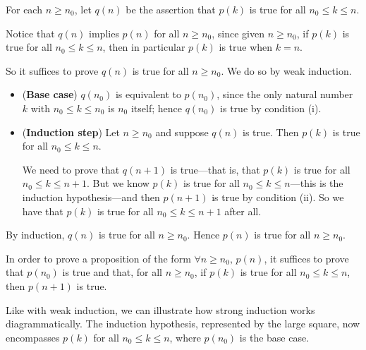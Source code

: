 \begin{cproof}
For each $n \ge n_0$, let $q(n)$ be the assertion that $p(k)$ is true for all $n_0 \le k \le n$.

Notice that $q(n)$ implies $p(n)$ for all $n \ge n_0$, since given $n \ge n_0$, if $p(k)$ is true for all $n_0 \le k \le n$, then in particular $p(k)$ is true when $k=n$.

So it suffices to prove $q(n)$ is true for all $n \ge n_0$. We do so by weak induction.

\begin{itemize}
\item (\textbf{Base case}) $q(n_0)$ is equivalent to $p(n_0)$, since the only natural number $k$ with $n_0 \le k \le n_0$ is $n_0$ itself; hence $q(n_0)$ is true by condition (i).

\item (\textbf{Induction step}) Let $n \ge n_0$ and suppose $q(n)$ is true. Then $p(k)$ is true for all $n_0 \le k \le n$.

We need to prove that $q(n+1)$ is true---that is, that $p(k)$ is true for all $n_0 \le k \le n+1$. But we know $p(k)$ is true for all $n_0 \le k \le n$---this is the induction hypothesis---and then $p(n+1)$ is true by condition (ii). So we have that $p(k)$ is true for all $n_0 \le k \le n+1$ after all.
\end{itemize}
By induction, $q(n)$ is true for all $n \ge n_0$. Hence $p(n)$ is true for all $n \ge n_0$.
\end{cproof}

\begin{strategy}
\label{strStrongInduction}
In order to prove a proposition of the form $\forall n \ge n_0,\, p(n)$, it suffices to prove that $p(n_0)$ is true and that, for all $n \ge n_0$, if $p(k)$ is true for all $n_0 \le k \le n$, then $p(n+1)$ is true.
\end{strategy}

Like with weak induction, we can illustrate how strong induction works diagrammatically. The induction hypothesis, represented by the large square, now encompasses $p(k)$ for all $n_0 \le k \le n$, where $p(n_0)$ is the base case.

\begin{center}
\end{center}

